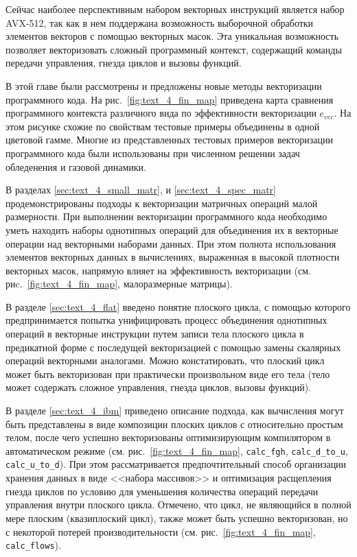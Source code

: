 Сейчас наиболее перспективным набором векторных инструкций является набор AVX-512\label{abbr:avx-13}, так как в нем поддержана возможность выборочной обработки элементов векторов с помощью векторных масок.
Эта уникальная возможность позволяет векторизовать сложный программный контекст, содержащий команды передачи управления, гнезда циклов и вызовы функций.

В этой главе были рассмотрены и предложены новые методы векторизации программного кода.
На рис.~\ref{fig:text_4_fin_map} приведена карта сравнения программного контекста различного вида по эффективности векторизации $e_{vec}$.
На этом рисунке схожие по свойствам тестовые примеры объединены в одной цветовой гамме.
Многие из представленных тестовых примеров векторизации программного кода были использованы при численном решении задач обледенения и газовой динамики.

В разделах \ref{sec:text_4_small_matr}, и \ref{sec:text_4_spec_matr} продемонстрированы подходы к векторизации матричных операций малой размерности.
При выполнении векторизации программного кода необходимо уметь находить наборы однотипных операций для объединения их в векторные операции над векторными наборами данных.
При этом полнота использования элементов векторных данных в вычислениях, выраженная в высокой плотности векторных масок, напрямую влияет на эффективность векторизации (см. риc.~\ref{fig:text_4_fin_map}, малоразмерные матрицы).

В разделе \ref{sec:text_4_flat} введено понятие плоского цикла, с помощью которого предпринимается попытка унифицировать процесс объединения однотипных операций в векторные инструкции путем записи тела плоского цикла в предикатной форме с последущей векторизацией с помощью замены скалярных операций векторными аналогами.
Можно констатировать, что плоский цикл может быть векторизован при практически произвольном виде его тела (тело может содержать сложное управления, гнезда циклов, вызовы функций).

В разделе \ref{sec:text_4_ibm} приведено описание подхода, как вычисления могут быть представлены в виде композиции плоских циклов с относительно простым телом, после чего успешно векторизованы оптимизирующим компилятором в автоматическом режиме (см. рис.~\ref{fig:text_4_fin_map}, \texttt{calc\_fgh}, \texttt{calc\_d\_to\_u}, \texttt{calc\_u\_to\_d}).
При этом рассматривается предпочтительный способ организации хранения данных в виде <<набора массивов>> и оптимизация расщепления гнезда циклов по условию для уменьшения количества операций передачи управления внутри плоского цикла.
Отмечено, что цикл, не являющийся в полной мере плоским (квазиплоский цикл), также может быть успешно векторизован, но с некоторой потерей производительности (см. рис.~\ref{fig:text_4_fin_map}, \texttt{calc\_flows}).

